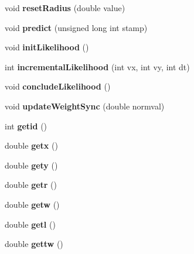 \begin{DoxyCompactItemize}
\item 
void {\bfseries reset\+Radius} (double value)\hypertarget{classvParticle_a20fca983783950a35bcc737ebd705d0b}{}\label{classvParticle_a20fca983783950a35bcc737ebd705d0b}

\item 
void {\bfseries predict} (unsigned long int stamp)\hypertarget{classvParticle_a4f577057ec03af89721ff0abf3daaf5a}{}\label{classvParticle_a4f577057ec03af89721ff0abf3daaf5a}

\item 
void {\bfseries init\+Likelihood} ()\hypertarget{classvParticle_aeb6f48a94882492e7959cab8cc670714}{}\label{classvParticle_aeb6f48a94882492e7959cab8cc670714}

\item 
int {\bfseries incremental\+Likelihood} (int vx, int vy, int dt)\hypertarget{classvParticle_ad99a216eb8cc0ac87385777919a21267}{}\label{classvParticle_ad99a216eb8cc0ac87385777919a21267}

\item 
void {\bfseries conclude\+Likelihood} ()\hypertarget{classvParticle_ae16c098e00f11d2858edef59fc323c53}{}\label{classvParticle_ae16c098e00f11d2858edef59fc323c53}

\item 
void {\bfseries update\+Weight\+Sync} (double normval)\hypertarget{classvParticle_a71ac3f26d797818df2c671cb63ef5a60}{}\label{classvParticle_a71ac3f26d797818df2c671cb63ef5a60}

\item 
int {\bfseries getid} ()\hypertarget{classvParticle_a121f7c012ccbb6153eda5bee38ba310b}{}\label{classvParticle_a121f7c012ccbb6153eda5bee38ba310b}

\item 
double {\bfseries getx} ()\hypertarget{classvParticle_a3d198bc0a1b1a475ab0b044bbff61488}{}\label{classvParticle_a3d198bc0a1b1a475ab0b044bbff61488}

\item 
double {\bfseries gety} ()\hypertarget{classvParticle_a40050ef035199b05e7cfd2601003d68a}{}\label{classvParticle_a40050ef035199b05e7cfd2601003d68a}

\item 
double {\bfseries getr} ()\hypertarget{classvParticle_ac78d2469a78798f791a5dab9f69b732e}{}\label{classvParticle_ac78d2469a78798f791a5dab9f69b732e}

\item 
double {\bfseries getw} ()\hypertarget{classvParticle_ac75939f4ac46ee086991fb629c583ada}{}\label{classvParticle_ac75939f4ac46ee086991fb629c583ada}

\item 
double {\bfseries getl} ()\hypertarget{classvParticle_a9b43157a0b2b278873c78806ccd75f6f}{}\label{classvParticle_a9b43157a0b2b278873c78806ccd75f6f}

\item 
double {\bfseries gettw} ()\hypertarget{classvParticle_a1760cb3cbd3014e6f5cf0a55e5d4dfff}{}\label{classvParticle_a1760cb3cbd3014e6f5cf0a55e5d4dfff}

\end{DoxyCompactItemize}


